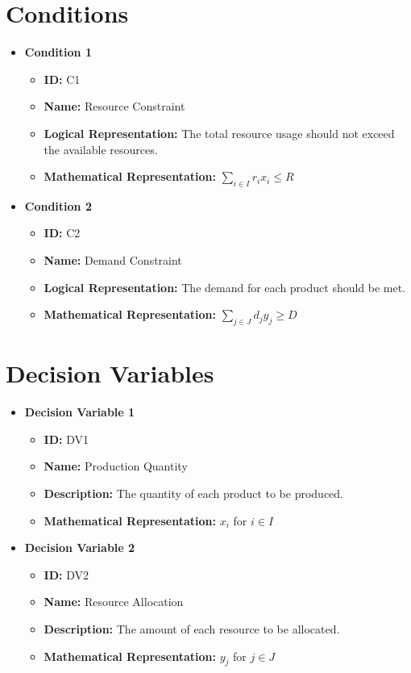 \documentclass{article}
\begin{document}
\section{Conditions}
\begin{itemize}
    \item \textbf{Condition 1}
    \begin{itemize}
        \item \textbf{ID:} C1
        \item \textbf{Name:} Resource Constraint
        \item \textbf{Logical Representation:} The total resource usage should not exceed the available resources.
        \item \textbf{Mathematical Representation:} $\sum_{i \in I} r_i x_i \leq R$
    \end{itemize}
    \item \textbf{Condition 2}
    \begin{itemize}
        \item \textbf{ID:} C2
        \item \textbf{Name:} Demand Constraint
        \item \textbf{Logical Representation:} The demand for each product should be met.
        \item \textbf{Mathematical Representation:} $\sum_{j \in J} d_j y_j \geq D$
    \end{itemize}
\end{itemize}

\section{Decision Variables}
\begin{itemize}
    \item \textbf{Decision Variable 1}
    \begin{itemize}
        \item \textbf{ID:} DV1
        \item \textbf{Name:} Production Quantity
        \item \textbf{Description:} The quantity of each product to be produced.
        \item \textbf{Mathematical Representation:} $x_i$ for $i \in I$
    \end{itemize}
    \item \textbf{Decision Variable 2}
    \begin{itemize}
        \item \textbf{ID:} DV2
        \item \textbf{Name:} Resource Allocation
        \item \textbf{Description:} The amount of each resource to be allocated.
        \item \textbf{Mathematical Representation:} $y_j$ for $j \in J$
    \end{itemize}
\end{itemize}
\end{document}
